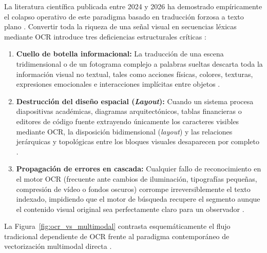 La literatura científica publicada entre 2024 y 2026 ha demostrado empíricamente el colapso operativo de este paradigma basado en traducción forzosa a texto plano \cite{prajwal2025multimodal}. Convertir toda la riqueza de una señal visual en secuencias léxicas mediante OCR introduce tres deficiencias estructurales críticas \cite{prajwal2025multimodal}:
\begin{enumerate}
    \item \textbf{Cuello de botella informacional:} La traducción de una escena tridimensional o de un fotograma complejo a palabras sueltas descarta toda la información visual no textual, tales como acciones físicas, colores, texturas, expresiones emocionales e interacciones implícitas entre objetos \cite{prajwal2025multimodal}.
    \item \textbf{Destrucción del diseño espacial (\textit{Layout}):} Cuando un sistema procesa diapositivas académicas, diagramas arquitectónicos, tablas financieras o editores de código fuente extrayendo únicamente los caracteres visibles mediante OCR, la disposición bidimensional (\textit{layout}) y las relaciones jerárquicas y topológicas entre los bloques visuales desaparecen por completo \cite{prajwal2025multimodal}.
    \item \textbf{Propagación de errores en cascada:} Cualquier fallo de reconocimiento en el motor OCR (frecuente ante cambios de iluminación, tipografías pequeñas, compresión de vídeo o fondos oscuros) corrompe irreversiblemente el texto indexado, impidiendo que el motor de búsqueda recupere el segmento aunque el contenido visual original sea perfectamente claro para un observador \cite{prajwal2025multimodal}.
\end{enumerate}

La Figura~\ref{fig:ocr_vs_multimodal} contrasta esquemáticamente el flujo tradicional dependiente de OCR frente al paradigma contemporáneo de vectorización multimodal directa \cite{prajwal2025multimodal}.


